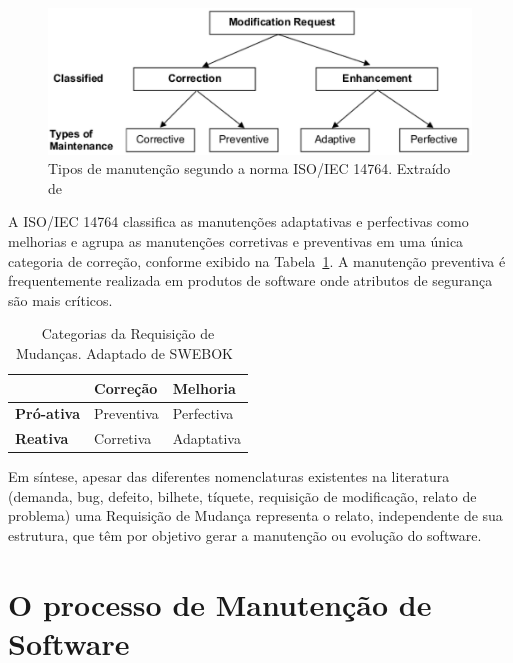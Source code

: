\begin{figure}[hbtp] \centering \includegraphics[width=.75\textwidth]
	{chapter-intro/img/modification_request.eps} \caption{Tipos de manutenção
		segundo a norma ISO/IEC 14764. Extraído de~\cite{1703974}}
	\label{fig:modification-request} \end{figure}

A ISO/IEC 14764 classifica as manutenções adaptativas e perfectivas como
me\-lho\-ri\-as e agrupa as manutenções corretivas e preventivas em uma única
categoria de correção, conforme exibido na
Tabela~\ref{tab:categorias_requisicao_mudanca}. A manutenção preventiva é 
frequentemente realizada em produtos de software onde atributos de segurança são
mais críticos.

\begin{table}[htpb] \centering 	\begin{tabular}{l|l|l|} \cline{2-3} &
		\textbf{Correção} & \textbf{Melhoria} \\ \hline
		\multicolumn{1}{|l|}{\textbf{Pró-ativa}} & Preventiva & Perfectiva \\
		\hline \multicolumn{1}{|l|}{\textbf{Reativa}} & Corretiva & Adaptativa
		\\ \hline \end{tabular}\caption{Categorias da Requisição de Mudanças.
		Adaptado de
		SWEBOK~\cite{4425813}}\label{tab:categorias_requisicao_mudanca}
\end{table}

Em síntese, apesar das diferentes nomenclaturas existentes na literatura
(demanda, bug, defeito, bilhete, tíquete, requisição de modificação, relato de
problema) uma Requisição de Mudança representa o relato, independente de sua
estrutura, que têm por objetivo gerar a manutenção ou evolução do software.

\section{O processo de Manutenção de Software}
\label{sec:o_processo_de_manutecao_de_software}

